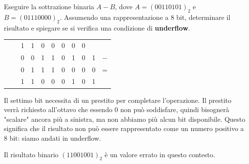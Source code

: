 \begin{Exercise}[label={ex:sottrazione_underflow_final_v3}]
    Eseguire la sottrazione binaria $A - B$, dove $A = (00110101)_2$ e $B = (01110000)_2$.
    Assumendo una rappresentazione a 8 bit, determinare il risultato e spiegare se si verifica una condizione di \textbf{underflow}.
\end{Exercise}

\begin{Answer}[ref={ex:sottrazione_underflow_final_v3}]
    
    \begin{table}[H]
    \centering
    \begin{tabular}{ccccccccccc}
        & & 1 & 1 & 0 & 0 & 0 & 0 & 0 & \\ %
        & & 0 & 0 & 1 & 1 & 0 & 1 & 0 & 1 & $-$ \\ %
        & & 0 & 1 & 1 & 1 & 0 & 0 & 0 & 0 & = \\ %
        \hline
        & & 1 & 1 & 0 & 0 & 0 & 1 & 0 & 1 & \\ %
    \end{tabular}
    \end{table}

    Il settimo bit necessita di un prestito per completare l'operazione. Il prestito verrà richiesto all'ottavo che essendo 0 non può soddisfare, quindi bisognerà "scalare" ancora più a sinistra, ma non abbiamo più alcun bit disponibile. Questo significa che il risultato non può essere rappresentato come un numero positivo a 8 bit: siamo andati in underflow.
    
    Il risultato binario $(11001001)_2$ è un valore errato in questo contesto.
\end{Answer}
